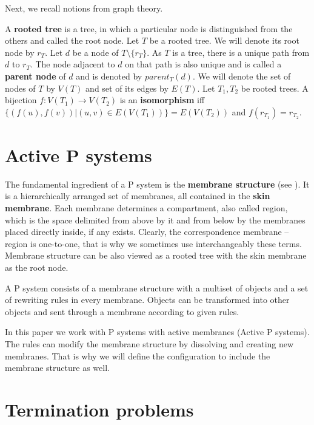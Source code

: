 \documentclass[llncs,submission,copyright,creativecommons]{../lib/lncs/llncs}
\begin{document}
Next, we recall notions from graph theory.

A {\bf rooted tree} is a tree, in which a particular node is distinguished from the others and called the root node.
Let $T$ be a rooted tree. We will denote its root node by $r_T$.
Let $d$ be a node of $T\setminus\{r_T\}$.
As $T$ is a tree, there is a unique path from $d$ to $r_T$. 
The node adjacent to $d$ on that path is also unique and is called a {\bf parent node} of $d$ and is denoted by $parent_T(d)$.
We will denote the set of nodes of $T$ by $V(T)$ and set of its edges by $E(T)$.
Let $T_1, T_2$ be rooted trees. A bijection $f: V(T_1)\rightarrow V(T_2)$ is an {\bf isomorphism} iff $\{(f(u),f(v))|(u,v)\in E(V(T_1))\} = E(V(T_2))$ and $f(r_{T_1}) = r_{T_2}$. 

  
\section{Active P systems}
\label{sec:p systems}


The fundamental ingredient of a P system is the {\bf membrane structure} (see \cite{Paun2006Introduction}). It is a hierarchically arranged set of membranes, all contained in the {\bf skin membrane}. Each membrane determines a compartment, also called region, which is the space delimited from above by it and from below by the membranes placed directly inside, if any exists. Clearly, the correspondence membrane – region is one-to-one, that is why we sometimes use interchangeably these terms.
Membrane structure can be also viewed as a rooted tree with the skin membrane as the root node.

A P system consists of a membrane structure with a multiset of objects and a set of rewriting rules in every membrane.
Objects can be transformed into other objects and sent through a membrane according to given rules.

In this paper we work with P systems with active membranes (Active P systems). The rules can modify the membrane structure by dissolving and creating new membranes. That is why we will define the configuration to include the membrane structure as well.




\section{Termination problems} %
\label{sec:termination_problems}
\end{document}
